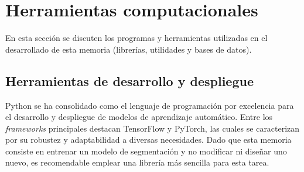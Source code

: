 \section{Herramientas computacionales}
En esta sección se discuten los programas y herramientas utilizadas en el desarrollado de esta memoria (librerías, utilidades y bases de datos).

\subsection{Herramientas de desarrollo y despliegue}
Python se ha consolidado como el lenguaje de programación por excelencia para el desarrollo y despliegue de modelos de aprendizaje automático. Entre los \textit{frameworks} principales destacan TensorFlow y PyTorch, las cuales se caracterizan por su robustez y adaptabilidad a diversas necesidades. Dado que esta memoria consiste en entrenar un modelo de segmentación y no modificar ni diseñar uno nuevo, es recomendable emplear una librería más sencilla para esta tarea.

